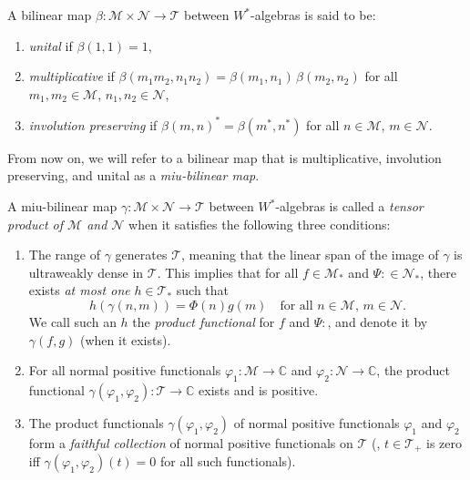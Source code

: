 \begin{definition}
  A bilinear map \( \beta:  \mathscr{M} \times  \mathscr{N} \to  \mathscr{T} \) between $W^*$-algebras is said to be:
\begin{enumerate}
    \item \emph{unital} if \( \beta(1,1) = 1 \),
    \item \emph{multiplicative} if \( \beta(m_1m_2, n_1n_2) = \beta(m_1, n_1) \, \beta(m_2, n_2) \) for all \( m_1, m_2 \in \mathscr{M} \), \( n_1, n_2  \in \mathscr{N}\),
    \item \emph{involution preserving} if \( \beta(m, n)^* = \beta(m^*, n^*) \) for all \( n \in \mathscr{M} \), \( m \in \mathscr{N} \).
\end{enumerate}
From now on, we will refer to a bilinear map that is multiplicative, involution preserving, and unital as a \emph{miu-bilinear map}.
\end{definition}


\begin{definition}
  A miu-bilinear map \( \gamma: \mathscr{M} \times \mathscr{N} \to \mathscr{T} \) between $W^*$-algebras is called a \emph{tensor product of \( \mathscr{M} \) and \( \mathscr{N} \)} when it satisfies the following three conditions:

\begin{enumerate}
    \item The range of \( \gamma \) generates \( \mathscr{T} \), meaning that the linear span of the image of \( \gamma \) is ultraweakly dense in \( \mathscr{T} \). This implies that for all \( f \in \mathscr{M}_* \) and \(\Psi:\in \mathscr{N}_* \), there exists \emph{at most one} \( h \in \mathscr{T}_* \) such that
    \[
    h(\gamma(n, m)) = \Phi(n) g(m) \quad \text{for all } n \in \mathscr{M}, \, m \in \mathscr{N}.
    \]
    We call such an \( h \) the \emph{product functional} for \( f \) and \(\Psi:\), and denote it by \( \gamma(f, g) \) (when it exists).

    \item For all normal positive functionals \( \varphi_1: \mathscr{M} \to \mathbb{C} \) and \(  \varphi_2: \mathscr{N} \to \mathbb{C} \), the product functional \( \gamma( \varphi_1,  \varphi_2): \mathscr{T} \to \mathbb{C} \) exists and is positive.

    \item The product functionals \( \gamma( \varphi_1,  \varphi_2) \) of normal positive functionals \( \varphi_1 \) and \( \varphi_2\) form a \emph{faithful collection} of normal positive functionals on \( \mathscr{T} \) (\ie, \( t \in \mathscr{T}_+ \) is zero iff \( \gamma(\varphi_1, \varphi_2)(t) = 0 \) for all such functionals).

\end{enumerate}
\end{definition}

